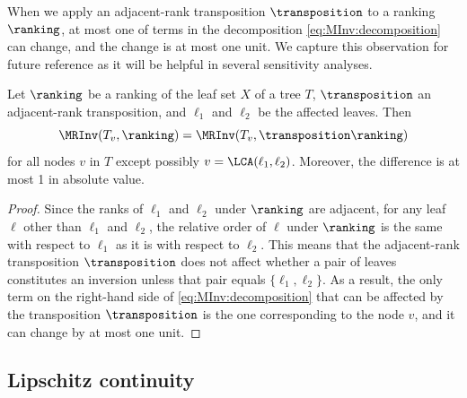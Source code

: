 \documentclass{toc}
\begin{document}
When we apply an adjacent-rank transposition $\transposition$ to a ranking $\ranking$, at most one of terms in the decomposition \eqref{eq:MInv:decomposition} can change, and the change is at most one unit. We capture this observation for future reference
as it will be helpful in several sensitivity analyses.
\begin{proposition}\label{prop:change}
Let $\ranking$ be a ranking of the leaf set $X$ of a tree $T$, $\transposition$ an adjacent-rank transposition, and $\ell_1$ and $\ell_2$ be the affected leaves. Then
\[ \MRInv(T_v,\ranking) = \MRInv(T_v,\transposition \ranking) \]
for all nodes $v$ in $T$ except possibly $v = \LCA(\ell_1,\ell_2)$. Moreover, the difference is at most 1 in absolute value.
\end{proposition}
\begin{proof}
Since the ranks of $\ell_1$ and $\ell_2$ under $\ranking$ are adjacent, for any leaf $\ell$ other than $\ell_1$ and $\ell_2$, the relative order of $\ell$ under $\ranking$ is the same with respect to $\ell_1$ as it is with respect to $\ell_2$. This means that the adjacent-rank transposition $\transposition$ does not affect whether a pair of leaves constitutes an inversion unless that pair equals $\{\ell_1,\ell_2\}$. As a result, the only term on the right-hand side of \eqref{eq:MInv:decomposition} that can be affected by the transposition $\transposition$ is the one corresponding to the node $v$, and it can change by at most one unit.
\end{proof}

\subsection{Lipschitz continuity}
\label{sec:lipschitz}
\end{document}
